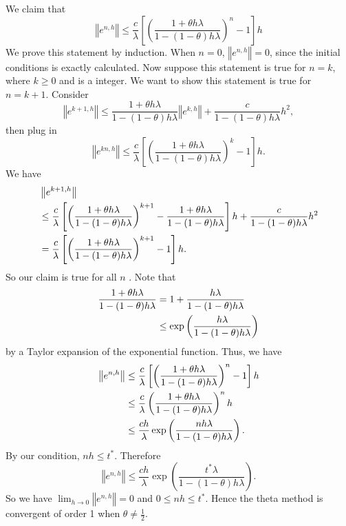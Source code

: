 We claim that 
\begin{equation}
\left\Vert e^{n,h}\right\Vert \leq\frac{c}{\lambda}\left[\left(\frac{1+\theta h\lambda}{1-(1-\theta)h\lambda}\right)^{n}-1\right]h
\end{equation}
We prove this statement by induction.  When $n=0$, $\left\Vert e^{n,h}\right\Vert =0$, since the initial conditions is exactly calculated. Now suppose this statement is true for $n=k$, where $k\geq0$ and is a integer. We want to show this statement is true for $n=k+1$. Consider
\begin{equation}
\left\Vert e^{k+1,h}\right\Vert \leq\frac{1+\theta h\lambda}{1-(1-\theta)h\lambda}\left\Vert e^{k,h}\right\Vert +\frac{c}{1-(1-\theta)h\lambda}h^{2},
\end{equation}
then plug in 
\begin{equation}
\left\Vert e^{kn,h}\right\Vert \leq\frac{c}{\lambda}\left[\left(\frac{1+\theta h\lambda}{1-(1-\theta)h\lambda}\right)^{k}-1\right]h.
\end{equation}
We have
\begin{align} 
&{} \left\Vert e^{k+1,h}\right\Vert 
\\&{} \leq\frac{c}{\lambda}\left[\left(\frac{1+\theta h\lambda}{1-(1-\theta)h\lambda}\right)^{k+1}-\frac{1+\theta h\lambda}{1-(1-\theta)h\lambda}\right]h+\frac{c}{1-(1-\theta)h\lambda}h^{2} \notag
\\&{}=\frac{c}{\lambda}\left[\left(\frac{1+\theta h\lambda}{1-(1-\theta)h\lambda}\right)^{k+1}-1\right]h. \notag
\end{align}
So our claim is true for all $n$ . Note that 
\begin{align}
\frac{1+\theta h\lambda}{1-(1-\theta)h\lambda} &{}=1+\frac{h\lambda}{1-(1-\theta)h\lambda} 
\\&{}\leq \exp\left(\frac{h\lambda}{1-(1-\theta)h\lambda}\right) \notag
\end{align}
by a Taylor expansion of the exponential function. Thus, we have
\begin{align}
\left\Vert e^{n,h}\right\Vert&{} \leq\frac{c}{\lambda}\left[\left(\frac{1+\theta h\lambda}{1-(1-\theta)h\lambda}\right)^{n}-1\right]h
\\&{}\leq\frac{c}{\lambda}\left(\frac{1+\theta h\lambda}{1-(1-\theta)h\lambda}\right)^{n}h \notag
\\&{}\leq\frac{ch}{\lambda}\exp\left(\frac{nh\lambda}{1-(1-\theta)h\lambda}\right). \notag
\end{align}
By our condition, $nh\leq t^{*}.$
Therefore 
\begin{equation}
\left\Vert e^{n,h}\right\Vert \leq\frac{ch}{\lambda}\exp\left(\frac{t^{*}\lambda}{1-(1-\theta)h\lambda}\right).
\end{equation}
So we have $\lim_{h\rightarrow0}\left\Vert e^{n,h}\right\Vert =0$ and $0\leq nh\leq t^{*}$. Hence the theta method is convergent
of order 1 when $\theta\neq\frac{1}{2}.$ 

